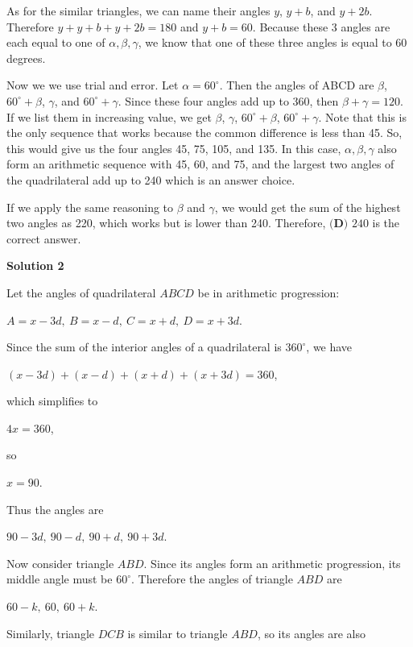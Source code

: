 \begin{enumerate}
 As for the similar triangles, we can name their angles $y$, $y+b$, and $y+2b$. Therefore $y+y+b+y+2b=180$ and $y+b=60$. Because these 3 angles are each equal to one of $\alpha, \beta, \gamma$, we know that one of these three angles is equal to 60 degrees.

 Now we we use trial and error. Let $\alpha = 60^{\circ}$. Then the angles of ABCD are $\beta$, $60^{\circ} + \beta$, $\gamma$, and $60^{\circ} + \gamma$. Since these four angles add up to 360, then $\beta + \gamma= 120$. If we list them in increasing value, we get $\beta$, $\gamma$, $60^{\circ} + \beta$, $60^{\circ} + \gamma$. Note that this is the only sequence that works because the common difference is less than 45. So, this would give us the four angles 45, 75, 105, and 135. In this case, $\alpha, \beta, \gamma$ also form an arithmetic sequence with 45, 60, and 75, and the largest two angles of the quadrilateral add up to 240 which is an answer choice.

 If we apply the same reasoning to $\beta$ and $\gamma$, we would get the sum of the highest two angles as 220, which works but is lower than 240. Therefore, $\boxed{\textbf{(D) }240}$ is the correct answer.

 


 


 



\textbf{Solution 2}

Let the angles of quadrilateral $ABCD$ be in arithmetic progression:

 $A=x-3d,\ B=x-d,\ C=x+d,\ D=x+3d$.

 Since the sum of the interior angles of a quadrilateral is $360^\circ$, we have

 $(x-3d)+(x-d)+(x+d)+(x+3d)=360$,

 which simplifies to

 $4x=360$,

 so

 $x=90$.

 Thus the angles are

 $90-3d,\ 90-d,\ 90+d,\ 90+3d$.

 Now consider triangle $ABD$. Since its angles form an arithmetic progression, its middle angle must be $60^\circ$. Therefore the angles of triangle $ABD$ are

 $60-k,\ 60,\ 60+k$.

 Similarly, triangle $DCB$ is similar to triangle $ABD$, so its angles are also


\end{enumerate}
